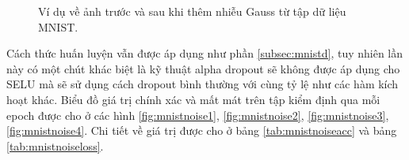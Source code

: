 \begin{figure}[ht!]
     \begin{center}
%
%
    \end{center}
    \caption{%
        Ví dụ về ảnh trước và sau khi thêm nhiễu Gauss từ tập dữ liệu MNIST.
     }%
  \label{fig:mnistexamplerawandnoise}
\end{figure}

Cách thức huấn luyện vẫn được áp dụng như phần \ref{subsec:mnistd}, tuy nhiên lần này có một chút khác biệt là kỹ thuật alpha dropout sẽ không được áp dụng cho SELU mà sẽ sử dụng cách dropout bình thường với cùng tỷ lệ như các hàm kích hoạt khác.
Biểu đồ giá trị chính xác và mất mát trên tập kiểm định qua mỗi epoch được cho ở các hình \ref{fig:mnistnoise1}, \ref{fig:mnistnoise2}, \ref{fig:mnistnoise3}, \ref{fig:mnistnoise4}.
Chi tiết về giá trị được cho ở bảng \ref{tab:mnistnoiseacc} và bảng \ref{tab:mnistnoiseloss}.

